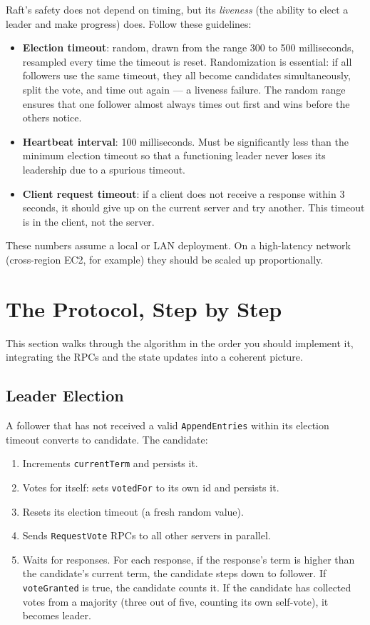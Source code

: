 \documentclass[11pt,a4paper]{article}
\begin{document}
Raft's safety does not depend on timing, but its \textit{liveness} (the ability to elect a leader and make progress) does. Follow these guidelines:

\begin{itemize}
\item \textbf{Election timeout}: random, drawn from the range 300 to 500 milliseconds, resampled every time the timeout is reset. Randomization is essential: if all followers use the same timeout, they all become candidates simultaneously, split the vote, and time out again --- a liveness failure. The random range ensures that one follower almost always times out first and wins before the others notice.

\item \textbf{Heartbeat interval}: 100 milliseconds. Must be significantly less than the minimum election timeout so that a functioning leader never loses its leadership due to a spurious timeout.

\item \textbf{Client request timeout}: if a client does not receive a response within 3 seconds, it should give up on the current server and try another. This timeout is in the client, not the server.
\end{itemize}

These numbers assume a local or LAN deployment. On a high-latency network (cross-region EC2, for example) they should be scaled up proportionally.

\section{The Protocol, Step by Step}

This section walks through the algorithm in the order you should implement it, integrating the RPCs and the state updates into a coherent picture.

\subsection{Leader Election}
A follower that has not received a valid \texttt{AppendEntries} within its election timeout converts to candidate. The candidate:

\begin{enumerate}
\item Increments \texttt{currentTerm} and persists it.
\item Votes for itself: sets \texttt{votedFor} to its own id and persists it.
\item Resets its election timeout (a fresh random value).
\item Sends \texttt{RequestVote} RPCs to all other servers in parallel.
\item Waits for responses. For each response, if the response's term is higher than the candidate's current term, the candidate steps down to follower. If \texttt{voteGranted} is true, the candidate counts it. If the candidate has collected votes from a majority (three out of five, counting its own self-vote), it becomes leader.
\end{enumerate}
\end{document}
